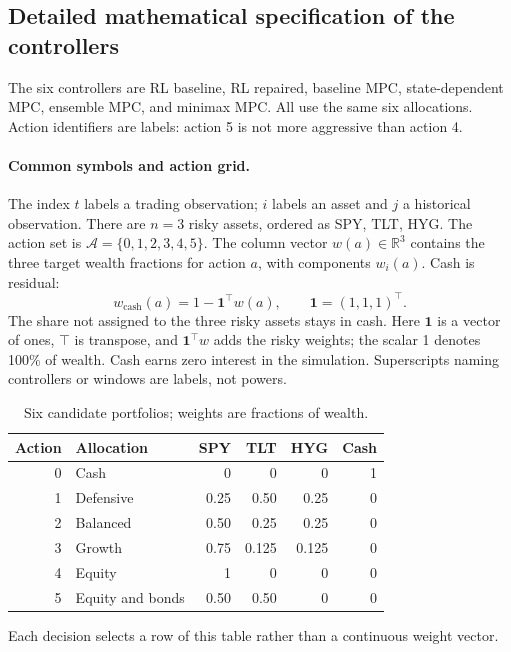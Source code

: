 \subsection{Detailed mathematical specification of the controllers}
The six controllers are RL baseline, RL repaired, baseline MPC, state-dependent MPC, ensemble MPC, and minimax MPC. All use the same six allocations. Action identifiers are labels: action 5 is not more aggressive than action 4.

\paragraph{Common symbols and action grid.}
The index $t$ labels a trading observation; $i$ labels an asset and $j$ a historical observation. There are $n=3$ risky assets, ordered as SPY, TLT, HYG. The action set is $\mathcal A=\{0,1,2,3,4,5\}$. The column vector $w(a)\in\mathbb R^3$ contains the three target wealth fractions for action $a$, with components $w_i(a)$. Cash is residual:
\begin{equation}
w_{\mathrm{cash}}(a)=1-\mathbf1^\top w(a),\qquad \mathbf1=(1,1,1)^\top.
\label{eq:cash-weight}
\end{equation}
The share not assigned to the three risky assets stays in cash.
Here $\mathbf1$ is a vector of ones, $\top$ is transpose, and $\mathbf1^\top w$ adds the risky weights; the scalar 1 denotes 100\% of wealth. Cash earns zero interest in the simulation. Superscripts naming controllers or windows are labels, not powers.

\begin{table}[H]
\centering
\caption{Six candidate portfolios; weights are fractions of wealth.}
\label{tab:action-grid}
\begin{tabular}{@{}rlrrrr@{}}
\toprule
Action & Allocation & SPY & TLT & HYG & Cash\\
\midrule
0 & Cash & 0 & 0 & 0 & 1\\
1 & Defensive & 0.25 & 0.50 & 0.25 & 0\\
2 & Balanced & 0.50 & 0.25 & 0.25 & 0\\
3 & Growth & 0.75 & 0.125 & 0.125 & 0\\
4 & Equity & 1 & 0 & 0 & 0\\
5 & Equity and bonds & 0.50 & 0.50 & 0 & 0\\
\bottomrule
\end{tabular}
\end{table}
Each decision selects a row of this table rather than a continuous weight vector.

